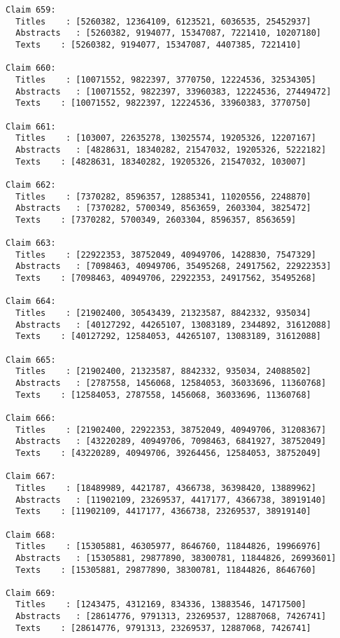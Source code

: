 \documentclass[11pt]{article}
\begin{document}
\begin{Verbatim}[commandchars=\\\{\}]
Claim 659:
  Titles    : [5260382, 12364109, 6123521, 6036535, 25452937]
  Abstracts   : [5260382, 9194077, 15347087, 7221410, 10207180]
  Texts    : [5260382, 9194077, 15347087, 4407385, 7221410]

Claim 660:
  Titles    : [10071552, 9822397, 3770750, 12224536, 32534305]
  Abstracts   : [10071552, 9822397, 33960383, 12224536, 27449472]
  Texts    : [10071552, 9822397, 12224536, 33960383, 3770750]

Claim 661:
  Titles    : [103007, 22635278, 13025574, 19205326, 12207167]
  Abstracts   : [4828631, 18340282, 21547032, 19205326, 5222182]
  Texts    : [4828631, 18340282, 19205326, 21547032, 103007]

Claim 662:
  Titles    : [7370282, 8596357, 12885341, 11020556, 2248870]
  Abstracts   : [7370282, 5700349, 8563659, 2603304, 3825472]
  Texts    : [7370282, 5700349, 2603304, 8596357, 8563659]

Claim 663:
  Titles    : [22922353, 38752049, 40949706, 1428830, 7547329]
  Abstracts   : [7098463, 40949706, 35495268, 24917562, 22922353]
  Texts    : [7098463, 40949706, 22922353, 24917562, 35495268]

Claim 664:
  Titles    : [21902400, 30543439, 21323587, 8842332, 935034]
  Abstracts   : [40127292, 44265107, 13083189, 2344892, 31612088]
  Texts    : [40127292, 12584053, 44265107, 13083189, 31612088]

Claim 665:
  Titles    : [21902400, 21323587, 8842332, 935034, 24088502]
  Abstracts   : [2787558, 1456068, 12584053, 36033696, 11360768]
  Texts    : [12584053, 2787558, 1456068, 36033696, 11360768]

Claim 666:
  Titles    : [21902400, 22922353, 38752049, 40949706, 31208367]
  Abstracts   : [43220289, 40949706, 7098463, 6841927, 38752049]
  Texts    : [43220289, 40949706, 39264456, 12584053, 38752049]

Claim 667:
  Titles    : [18489989, 4421787, 4366738, 36398420, 13889962]
  Abstracts   : [11902109, 23269537, 4417177, 4366738, 38919140]
  Texts    : [11902109, 4417177, 4366738, 23269537, 38919140]

Claim 668:
  Titles    : [15305881, 46305977, 8646760, 11844826, 19966976]
  Abstracts   : [15305881, 29877890, 38300781, 11844826, 26993601]
  Texts    : [15305881, 29877890, 38300781, 11844826, 8646760]

Claim 669:
  Titles    : [1243475, 4312169, 834336, 13883546, 14717500]
  Abstracts   : [28614776, 9791313, 23269537, 12887068, 7426741]
  Texts    : [28614776, 9791313, 23269537, 12887068, 7426741]


\end{Verbatim}
\end{document}
